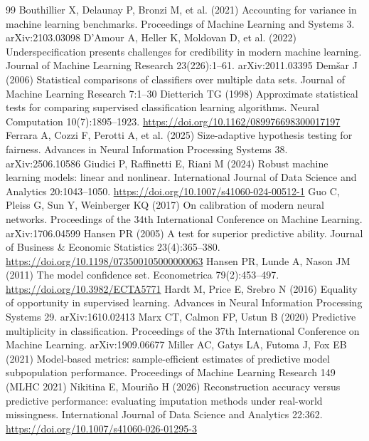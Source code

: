 \documentclass[pdflatex,sn-mathphys-num,iicol]{sn-jnl}
\theoremstyle{thmstyleone}
\theoremstyle{thmstyletwo}
\begin{document}
\begin{thebibliography}{99}
 Bouthillier X, Delaunay P, Bronzi M, et al. (2021) Accounting for variance in machine learning benchmarks. Proceedings of Machine Learning and Systems 3. arXiv:2103.03098
 D'Amour A, Heller K, Moldovan D, et al. (2022) Underspecification presents challenges for credibility in modern machine learning. Journal of Machine Learning Research 23(226):1--61. arXiv:2011.03395
 Dem{\v s}ar J (2006) Statistical comparisons of classifiers over multiple data sets. Journal of Machine Learning Research 7:1--30
 Dietterich TG (1998) Approximate statistical tests for comparing supervised classification learning algorithms. Neural Computation 10(7):1895--1923. \url{https://doi.org/10.1162/089976698300017197}
 Ferrara A, Cozzi F, Perotti A, et al. (2025) Size-adaptive hypothesis testing for fairness. Advances in Neural Information Processing Systems 38. arXiv:2506.10586
 Giudici P, Raffinetti E, Riani M (2024) Robust machine learning models: linear and nonlinear. International Journal of Data Science and Analytics 20:1043--1050. \url{https://doi.org/10.1007/s41060-024-00512-1}
 Guo C, Pleiss G, Sun Y, Weinberger KQ (2017) On calibration of modern neural networks. Proceedings of the 34th International Conference on Machine Learning. arXiv:1706.04599
 Hansen PR (2005) A test for superior predictive ability. Journal of Business \& Economic Statistics 23(4):365--380. \url{https://doi.org/10.1198/073500105000000063}
 Hansen PR, Lunde A, Nason JM (2011) The model confidence set. Econometrica 79(2):453--497. \url{https://doi.org/10.3982/ECTA5771}
 Hardt M, Price E, Srebro N (2016) Equality of opportunity in supervised learning. Advances in Neural Information Processing Systems 29. arXiv:1610.02413
 Marx CT, Calmon FP, Ustun B (2020) Predictive multiplicity in classification. Proceedings of the 37th International Conference on Machine Learning. arXiv:1909.06677
 Miller AC, Gatys LA, Futoma J, Fox EB (2021) Model-based metrics: sample-efficient estimates of predictive model subpopulation performance. Proceedings of Machine Learning Research 149 (MLHC 2021)
 Nikitina E, Mouri{\~n}o H (2026) Reconstruction accuracy versus predictive performance: evaluating imputation methods under real-world missingness. International Journal of Data Science and Analytics 22:362. \url{https://doi.org/10.1007/s41060-026-01295-3}

\end{thebibliography}
\end{document}

